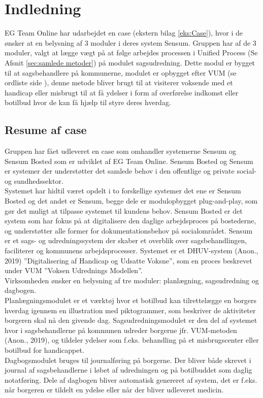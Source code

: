 \chapter{Indledning}
EG Team Online har udarbejdet en case (ekstern bilag \ref{eks:Case}), hvor i de ønsker at en belysning af 3 moduler i deres system Sensum. Gruppen har af de 3 moduler, valgt at lægge vægt på at følge arbejdes processen i Unified Process (Se Afsnit \ref{sec:samlede metoder}) på modulet sagsudredning. Dette modul er bygget til at sagsbehandlere på kommunerne, modulet er opbygget efter VUM (se ordliste side \pageref{sec:ordliste}), denne metode bliver brugt til at visiterer voksende med et handicap eller misbrugt til at få ydelser i form af overførelse indkomst eller botilbud hvor de kan få hjælp til styre deres hverdag.
\section{Resume af case}
Gruppen har fået udleveret en case som omhandler systemerne Sensum og Sensum Bosted som er udviklet af EG Team Online. Sensum Bosted og Sensum er systemer der understøtter det samlede behov i den offentlige og private social- og sundhedssektor.\\
Systemet har hidtil været opdelt i to forskellige systemer det ene er Sensum Bosted og det andet er Sensum, begge dele er modulopbygget plug-and-play, som gør det muligt at tilpasse systemet til kundens behov. Sensum Bosted er det system som har fokus på at digitalisere den daglige arbejdsproces på bostederne, og understøtter alle former for dokumentationsbehov på socialområdet. Sensum er et sags- og udredningssystem der skaber et overblik over sagsbehandlingen, faciliterer og kommunens arbejdsprocesser. Systemet er et DHUV-system 
(Anon., 2019) %
”Digitalisering af Handicap og Udsatte Voksne”, som en proces beskrevet under VUM ”Voksen Udrednings Modellen”.\\
Virksomheden ønsker en belysning af tre moduler: planlægning, sagsudredning og dagbogen. \\
Planlægningsmodulet er et værktøj hvor et botilbud kan tilrettelægge en borgers hverdag igennem en illustration med piktogrammer, som beskriver de aktiviteter borgeren skal nå den givende dag.
Sagsudredningsmodulet er den del af systemet hvor i sagsbehandlerne på kommunen udreder borgerne jfr. VUM-metoden 
(Anon., 2019), %
og tildeler ydelser som f.eks. behandling på et misbrugscenter eller botilbud for handicappet.\\
Dagbogsmodulet bruges til journalføring på borgerne. Der bliver både skrevet i journal af sagsbehandlerne i løbet af udredningen og på botilbuddet som daglig notatføring. Dele af dagbogen bliver automatisk genereret af system, det er f.eks. når borgeren er tildelt en ydelse eller når der bliver udleveret medicin.
